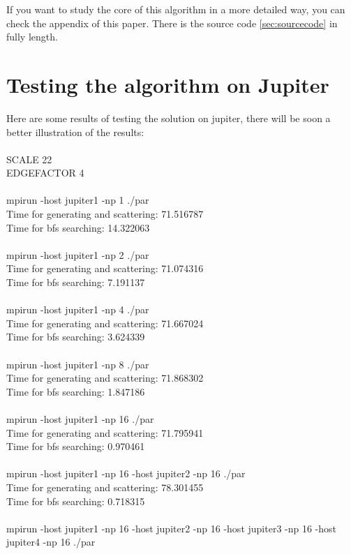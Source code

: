 \documentclass[12pt,a4paper]{article}
\begin{document}
If you want to study the core of this algorithm in a more detailed way, you can check the appendix of this paper. There is the source code \ref{sec:sourcecode} in fully length.



\section{Testing the algorithm on Jupiter}
\label{sec:testing}

Here are some results of testing the solution on jupiter, there will be soon a better illustration of the results: \\
\\
SCALE 22\\
EDGEFACTOR 4\\
\\
mpirun -host jupiter1 -np 1 ./par\\
Time for generating and scattering: 71.516787\\
Time for bfs searching: 14.322063\\
\\
mpirun -host jupiter1 -np 2 ./par\\
Time for generating and scattering: 71.074316\\
Time for bfs searching: 7.191137\\
\\
mpirun -host jupiter1 -np 4 ./par\\
Time for generating and scattering: 71.667024\\
Time for bfs searching: 3.624339\\
\\
mpirun -host jupiter1 -np 8 ./par\\
Time for generating and scattering: 71.868302\\
Time for bfs searching: 1.847186\\
\\
mpirun -host jupiter1 -np 16 ./par\\
Time for generating and scattering: 71.795941\\
Time for bfs searching: 0.970461\\
\\
mpirun -host jupiter1 -np 16 -host jupiter2 -np 16 ./par\\
Time for generating and scattering: 78.301455\\
Time for bfs searching: 0.718315\\
\\
mpirun -host jupiter1 -np 16 -host jupiter2 -np 16 -host jupiter3 -np 16 -host jupiter4 -np 16 ./par\\
\end{document}

